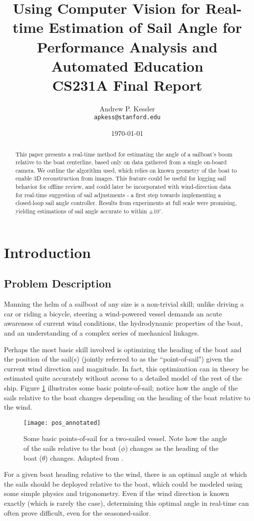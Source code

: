 \documentclass[letterpaper, 10 pt, conference]{ieeeconf}  %
\title{ {\bf Using Computer Vision for Real-time Estimation of Sail Angle for Performance Analysis and Automated Education } \\ CS231A Final Report}
\author{Andrew P. Kessler \\
\texttt{apkess@stanford.edu}}
\date{\today}
\begin{document}
\maketitle


\begin{abstract}

This paper presents a real-time method for estimating the angle of a sailboat's boom relative to the boat centerline, based only on data gathered from a single on-board camera.  We outline the algorithm used, which relies on known geometry of the boat to enable 3D reconstruction from images. This feature could be useful for logging sail behavior for offline review, and could later be incorporated with wind-direction data for real-time suggestion of sail adjustments - a first step towards implementing a closed-loop sail angle controller. Results from experiments at full scale were promising, yielding estimations of sail angle accurate to within $\pm 10 ^\circ$. 
\end{abstract}

\section{Introduction}
\subsection{Problem Description}
Manning the helm of a sailboat of any size is a non-trivial skill; unlike driving a car or riding a bicycle, steering a wind-powered vessel demands an acute awareness of current wind conditions, the hydrodynamic properties of the boat, and an understanding of a complex series of mechanical linkages. 

Perhaps the most basic skill involved is optimizing the heading of the boat and the position of the sail(s) (jointly referred to as the ``point-of-sail") given the current wind direction and magnitude. In fact, this optimization can in theory be estimated quite accurately without access to a detailed model of the rest of the ship. Figure \ref{fig:pos} illustrates some basic points-of-sail; notice how the angle of the sails relative to the boat changes depending on the heading of the boat relative to the wind. 

\begin{figure}[htbp]
   \centering
   \texttt{[image: pos\_annotated]} %
   \caption{Some basic points-of-sail for a two-sailed vessel. Note how the angle of the sails relative to the boat ($\phi$) changes as the heading of the boat ($\theta$) changes. Adapted from \cite{pos_img}. }
   \label{fig:pos}
\end{figure}
For a given boat heading relative to the wind, there is an optimal angle at which the sails should be deployed relative to the boat, which could be modeled using some simple physics and trigonometry. Even if the wind direction is known exactly (which is rarely the case), determining this optimal angle in real-time can often prove difficult, even for the seasoned-sailor.
\end{document}
